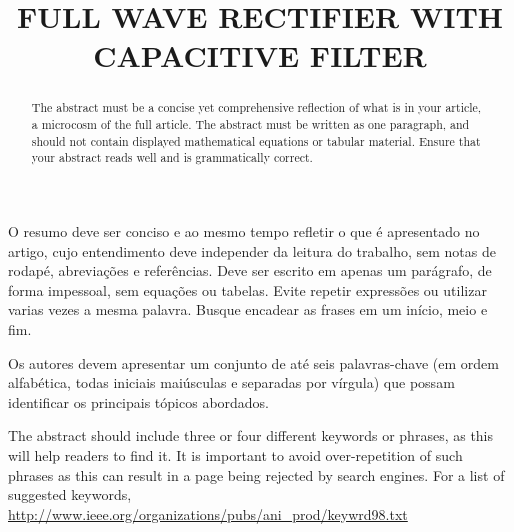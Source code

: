 
\title{FULL WAVE RECTIFIER WITH CAPACITIVE FILTER} %

\maketitle




\begin{resumo}  O resumo deve ser conciso e ao mesmo tempo refletir o que é apresentado no artigo, cujo entendimento deve independer da leitura do trabalho, sem notas de rodapé, abreviações e referências. Deve ser escrito em apenas um parágrafo, de forma impessoal, sem equações ou tabelas. Evite repetir expressões ou utilizar varias vezes a mesma palavra. Busque encadear as frases em um início, meio e fim.
\end{resumo}

\begin{palavraschave }
		Os autores devem apresentar um conjunto de até seis palavras-chave (em ordem alfabética, todas iniciais maiúsculas e separadas por vírgula) que possam identificar os principais tópicos abordados.	
\end{palavraschave }

\englishtitle

\begin{abstract}
	The abstract must be a concise yet comprehensive reflection of what is in your article, a microcosm of the full article. The abstract must be written as one paragraph, and should not contain displayed mathematical equations or tabular material.  Ensure that your abstract reads well and is grammatically correct.
\end{abstract}

\begin{keywords}
	The abstract should include three or four different keywords or phrases, as this will help readers to find it. It is important to avoid over-repetition of such phrases as this can result in a page being rejected by search engines. For a list of suggested keywords, \url{http://www.ieee.org/organizations/pubs/ani_prod/keywrd98.txt}
\end{keywords}




